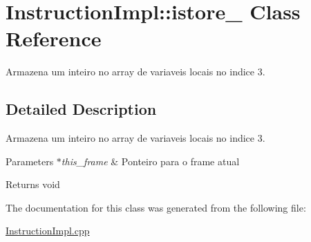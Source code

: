 \hypertarget{class_instruction_impl_1_1istore__3}{}\section{Instruction\+Impl\+:\+:istore\+\_ Class Reference}
\label{class_instruction_impl_1_1istore__3}


Armazena um inteiro no array de variaveis locais no indice 3.  




\subsection{Detailed Description}
Armazena um inteiro no array de variaveis locais no indice 3. 


\begin{DoxyParams}{Parameters}
{\em $\ast$this\+\_\+frame} & Ponteiro para o frame atual \\
\hline
\end{DoxyParams}
\begin{DoxyReturn}{Returns}
void 
\end{DoxyReturn}


The documentation for this class was generated from the following file\+:\begin{DoxyCompactItemize}
\item 
\hyperlink{_instruction_impl_8cpp}{Instruction\+Impl.\+cpp}\end{DoxyCompactItemize}
